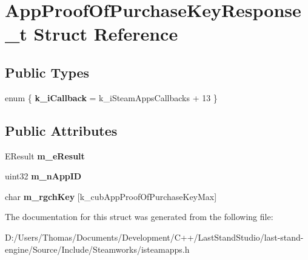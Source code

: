 \hypertarget{structAppProofOfPurchaseKeyResponse__t}{}\section{App\+Proof\+Of\+Purchase\+Key\+Response\+\_\+t Struct Reference}
\label{structAppProofOfPurchaseKeyResponse__t}
\subsection*{Public Types}
\begin{DoxyCompactItemize}
\item 
\hypertarget{structAppProofOfPurchaseKeyResponse__t_a04b321cb703098176f3e92befd6e94c8}{}enum \{ {\bfseries k\+\_\+i\+Callback} = k\+\_\+i\+Steam\+Apps\+Callbacks + 13
 \}\label{structAppProofOfPurchaseKeyResponse__t_a04b321cb703098176f3e92befd6e94c8}

\end{DoxyCompactItemize}
\subsection*{Public Attributes}
\begin{DoxyCompactItemize}
\item 
\hypertarget{structAppProofOfPurchaseKeyResponse__t_adc41cc95f68943c6e96a872a5faceb74}{}E\+Result {\bfseries m\+\_\+e\+Result}\label{structAppProofOfPurchaseKeyResponse__t_adc41cc95f68943c6e96a872a5faceb74}

\item 
\hypertarget{structAppProofOfPurchaseKeyResponse__t_a080b12d479f7498d3340d1b833f16c1d}{}uint32 {\bfseries m\+\_\+n\+App\+I\+D}\label{structAppProofOfPurchaseKeyResponse__t_a080b12d479f7498d3340d1b833f16c1d}

\item 
\hypertarget{structAppProofOfPurchaseKeyResponse__t_a081ecfd9ddc6bd03820dd29f340d76c2}{}char {\bfseries m\+\_\+rgch\+Key} \mbox{[}k\+\_\+cub\+App\+Proof\+Of\+Purchase\+Key\+Max\mbox{]}\label{structAppProofOfPurchaseKeyResponse__t_a081ecfd9ddc6bd03820dd29f340d76c2}

\end{DoxyCompactItemize}


The documentation for this struct was generated from the following file\+:\begin{DoxyCompactItemize}
\item 
D\+:/\+Users/\+Thomas/\+Documents/\+Development/\+C++/\+Last\+Stand\+Studio/last-\/stand-\/engine/\+Source/\+Include/\+Steamworks/isteamapps.\+h\end{DoxyCompactItemize}

